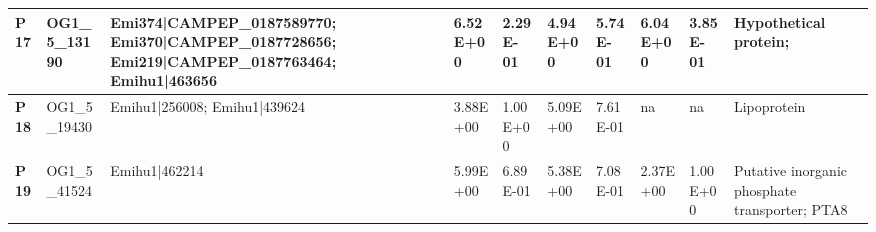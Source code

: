 \begin{landscape}
\begin{center}
\begin{footnotesize}
\begin{longtable}{|p{0.5cm}|p{1.5cm}|p{4cm}|l|l|l|l|l|l|l|}
\textbf{P17} & OG1\_5\_13190 & Emi374|CAMPEP\_0187589770; Emi370|CAMPEP\_0187728656; Emi219|CAMPEP\_0187763464; Emihu1|463656                                                                                                                                                                                                                                                                                                                                                                                                                                                                                                                                           & 6.52E+00  & 2.29E-01 & 4.94E+00  & 5.74E-01 & 6.04E+00  & 3.85E-01 & Hypothetical protein;                                                        \\ \hline
\textbf{P18} & OG1\_5\_19430 & Emihu1|256008; Emihu1|439624                                                                                                                                                                                                                                                                                                                                                                                                                                                                                                                                                                                                             & 3.88E+00  & 1.00E+00 & 5.09E+00  & 7.61E-01 & na        & na       & Lipoprotein                                                                  \\ \hline
\textbf{P19} & OG1\_5\_41524 & Emihu1|462214                                                                                                                                                                                                                                                                                                                                                                                                                                                                                                                                                                                                                            & 5.99E+00  & 6.89E-01 & 5.38E+00  & 7.08E-01 & 2.37E+00  & 1.00E+00 & Putative inorganic phosphate transporter; PTA8                               \\ \hline

\end{longtable}
\end{footnotesize}
\end{center}
\end{landscape}
